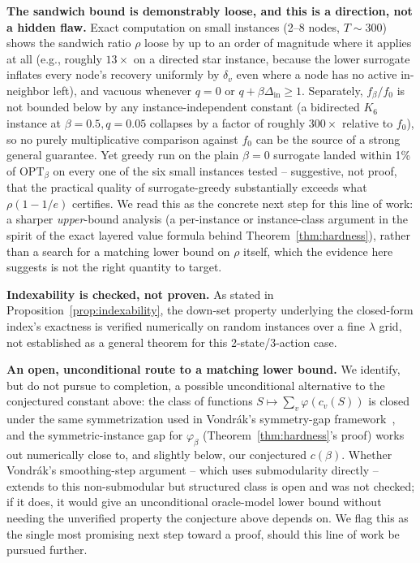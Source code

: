 \documentclass[journal]{IEEEtran}
\begin{document}
\textbf{The sandwich bound is demonstrably loose, and this is a direction,
not a hidden flaw.} Exact computation on small instances (2--8 nodes,
$T\sim300$) shows the sandwich ratio $\rho$ loose by up to an order of
magnitude where it applies at all (e.g., roughly $13\times$ on a directed
star instance, because the lower surrogate inflates every node's recovery
uniformly by $\delta_v$ even where a node has no active in-neighbor left),
and vacuous whenever $q=0$ or $q+\beta\Delta_{\mathrm{in}}\ge1$. Separately,
$f_\beta/f_0$ is not bounded below by any instance-independent constant (a
bidirected $K_6$ instance at $\beta=0.5,q=0.05$ collapses by a factor of
roughly $300\times$ relative to $f_0$), so no purely multiplicative
comparison against $f_0$ can be the source of a strong general guarantee.
Yet greedy run on the plain $\beta=0$ surrogate landed within 1\% of
$\mathrm{OPT}_\beta$ on every one of the six small instances tested --
suggestive, not proof, that the practical quality of surrogate-greedy
substantially exceeds what $\rho(1-1/e)$ certifies. We read this as the
concrete next step for this line of work: a sharper \emph{upper}-bound
analysis (a per-instance or instance-class argument in the spirit of the
exact layered value formula behind Theorem~\ref{thm:hardness}), rather
than a search for a matching lower bound on $\rho$ itself, which the
evidence here suggests is not the right quantity to target.

\textbf{Indexability is checked, not proven.} As stated in
Proposition~\ref{prop:indexability}, the down-set property underlying the
closed-form index's exactness is verified numerically on random instances
over a fine $\lambda$ grid, not established as a general theorem for this
2-state/3-action case.

\textbf{An open, unconditional route to a matching lower bound.} We
identify, but do not pursue to completion, a possible unconditional
alternative to the conjectured constant above: the class of functions
$S\mapsto\sum_v\varphi(c_v(S))$ is closed under the same symmetrization
used in Vondr{\'a}k's symmetry-gap framework~\cite{vondrak2013symmetry},
and the symmetric-instance gap for $\varphi_\beta$
(Theorem~\ref{thm:hardness}'s proof) works out numerically close to, and
slightly below, our conjectured $c(\beta)$. Whether Vondr{\'a}k's
smoothing-step argument -- which uses submodularity directly -- extends to
this non-submodular but structured class is open and was not checked; if
it does, it would give an unconditional oracle-model lower bound without
needing the unverified property the conjecture above depends on. We flag
this as the single most promising next step toward a proof, should this
line of work be pursued further.
\end{document}
